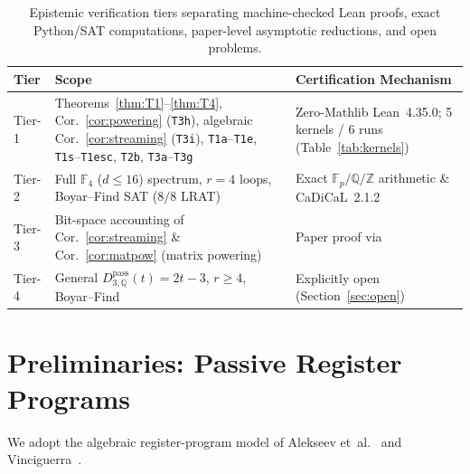 \documentclass[11pt,reqno]{amsart}
\theoremstyle{definition}
\newcommand{\F}{\mathbb{F}}
\newcommand{\Q}{\mathbb{Q}}
\newcommand{\Z}{\mathbb{Z}}
\newcommand{\pass}{\mathrm{pass}}
\begin{document}
\begin{table}[ht]
\centering
\caption{Epistemic verification tiers separating machine-checked Lean proofs, exact Python/SAT computations, paper-level asymptotic reductions, and open problems.}
\label{tab:tiers}
\footnotesize
\begin{tabular}{@{}l>{\raggedright\arraybackslash}p{6.8cm}>{\raggedright\arraybackslash}p{6.6cm}@{}}
\toprule
\textbf{Tier} & \textbf{Scope} & \textbf{Certification Mechanism} \\
\midrule
Tier-1 & Theorems~\ref{thm:T1}--\ref{thm:T4}, Cor.~\ref{cor:powering} (\texttt{T3h}), algebraic Cor.~\ref{cor:streaming} (\texttt{T3i}), \texttt{T1a}--\texttt{T1e}, \texttt{T1s}--\texttt{T1esc}, \texttt{T2b}, \texttt{T3a}--\texttt{T3g} & Zero-Mathlib Lean~4.35.0; 5 kernels / 6 runs (Table~\ref{tab:kernels}) \\
Tier-2 & Full $\F_4$ ($d \le 16$) spectrum, $r=4$ loops, Boyar--Find SAT ($8/8$ LRAT) & Exact $\F_p/\Q/\Z$ arithmetic \& CaDiCaL~2.1.2 \\
Tier-3 & Bit-space accounting of Cor.~\ref{cor:streaming} \& Cor.~\ref{cor:matpow} (matrix powering) & Paper proof via~\cite[Cor.~5.1.1, \S4.4, Thm.~5.2]{Vinciguerra2026} \\
Tier-4 & General $D_{3,\Q}^{\pass}(t)=2t-3$, $r \ge 4$, Boyar--Find & Explicitly open (Section~\ref{sec:open}) \\
\bottomrule
\end{tabular}
\end{table}

\section{Preliminaries: Passive Register Programs}
\label{sec:prelim}

We adopt the algebraic register-program model of Alekseev et~al.~\cite{AFM2025} and Vinciguerra~\cite[Definition~2.2]{Vinciguerra2026}.
\end{document}

